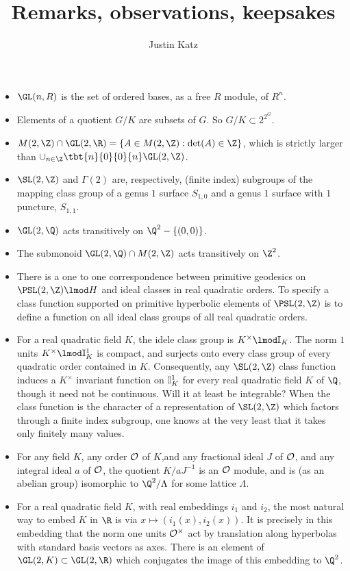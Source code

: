 \documentclass[11pt]{amsart}
\title{Remarks, observations, keepsakes}
\author{Justin Katz}
\begin{document}
\maketitle 

\begin{itemize}
	\item $\GL(n,R)$ is the set of ordered bases, as a free $R$ module, of $R^n$.
	\item Elements of a quotient $G/K$ are subsets of $G$. So $G/K\subset 2^{2^G}$. 
	\item $M(2,\Z) \cap \GL(2,\R)=\{A \in M(2,\Z): \det(A) \in \Z\}$, which is strictly larger than $\cup_{n\in \Z} \tbt{n}{0}{0}{n} \GL(2,\Z)$. 
	\item $\SL(2,\Z)$ and $\Gamma(2)$ are, respectively, (finite index) subgroups of the mapping class group of a genus $1$ surface $S_{1,0}$ and a genus $1$ surface with $1$ puncture, $S_{1,1}$. 
	\item $\GL(2,\Q)$ acts transitively on $\Q^2-\{(0,0)\}$.
	\item The submonoid $\GL(2,\Q)\cap M(2,\Z)$ acts transitively on $\Z^2$.
	\item There is a one to one correspondence between primitive geodesics on $\PSL(2,\Z)\lmod H$ and ideal classes in real quadratic orders. To specify a class function supported on primitive hyperbolic elements of $\PSL(2,\Z)$ is to define a function on all ideal class groups of all real quadratic orders.
	\item For a real quadratic field $K$, the idele class group is $ K^\times \lmod \Ideles_K$. The norm $1$ units $K^\times  \lmod \Ideles^1_K$ is compact, and surjects onto every class group of every quadratic order contained in $K$. Consequently, any $\SL(2,\Z)$ class function induces a $K^\times$ invariant function on $\mathbb{I}_K^1$ for every real quadratic field $K$ of $\Q$, though it need not be continuous. Will it at least be integrable? When the class function is the character of a representation of $\SL(2,\Z)$ which factors through a finite index subgroup, one knows at the very least that it takes only finitely many values. 
	\item For any field $K$, any order $\mathcal{O}$ of $K$,and any fractional ideal $J$ of $\mathcal{O}$, and any integral ideal $a$ of $\mathcal{O}$, the quotient $K/aJ^{-1}$ is an $\mathcal{O}$ module, and is (as an abelian group) isomorphic to $\Q^2/\Lambda$ for some lattice $\Lambda$.
	\item For a real quadratic field $K$, with real embeddings $i_1$ and $i_2$, the most natural way to embed $K$ in $\R$ is via $x\mapsto (i_1(x),i_2(x))$. It is precisely in this embedding that the norm one units $\mathcal{O}^\times$ act by translation along hyperbolas with standard basis vectors as axes.  There is an element of $\GL(2,K)\subset \GL(2,\R)$ which conjugates the image of this embedding to $\Q^2$.

\end{itemize}
\end{document}
